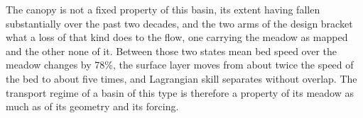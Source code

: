 The canopy is not a fixed property of this basin, its extent having fallen
substantially over the past two decades, and the two arms of the design bracket
what a loss of that kind does to the flow, one carrying the meadow as mapped and
the other none of it. Between those two states mean bed speed over the meadow
changes by 78\%, the surface layer moves from about twice the speed of the bed
to about five times, and Lagrangian skill separates without overlap. The
transport regime of a basin of this type is therefore a property of its meadow
as much as of its geometry and its forcing.
